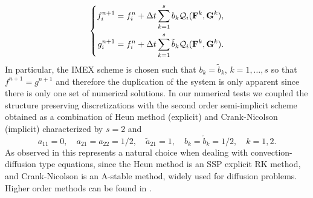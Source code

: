 \documentclass[a4paper]{article}
\theoremstyle{remark}\newtheorem{remark}{Remark}
\newcommand{\be}{\begin{equation}}
\newcommand{\ee}{\end{equation}}
\begin{document}
\be
\left\lbrace
\begin{split}
f_i^{n+1}&=f_i^n+\Delta t \sum_{k=1}^{s} b_k {\mathcal Q}_i({\bf F}^k,{\bf G}^k) ,\\
g_i^{n+1}&=f_i^n+\Delta t \sum_{k=1}^{s} {\tilde b}_{k} {\mathcal Q}_i({\bf F}^k,{\bf G}^k).
\end{split}
\right.
\ee
In particular, the IMEX scheme is chosen such that $b_k={\tilde b}_k$, $k=1,\ldots,s$ so that $f^{n+1}=g^{n+1}$ and therefore the duplication of the system is only apparent since there is only one set of numerical solutions. In our numerical tests we coupled the structure preserving discretizations with the second order semi-implicit scheme obtained as a combination of Heun method (explicit) and Crank-Nicolson (implicit) characterized by $s=2$ and
\be
a_{11}=0,\quad a_{21}=a_{22}=1/2,\quad \tilde a_{21}=1,\quad b_k={\tilde b}_k=1/2,\quad k=1,2.
\ee
As observed in \cite{BFR} this represents a natural
choice when dealing with convection-diffusion type equations, since the Heun method is an SSP explicit
RK method, and Crank-Nicolson is an A-stable method, widely used for diffusion problems. Higher order methods can be found in \cite{BFR,PR}.
\end{document}
